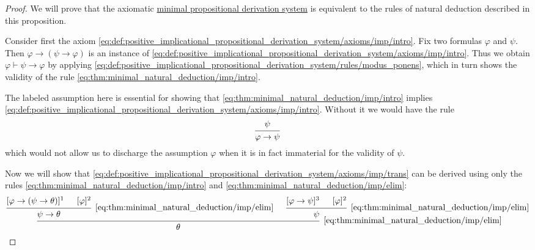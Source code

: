 \begin{proof}
  We will prove that the axiomatic \hyperref[def:minimal_propositional_derivation_system]{minimal propositional derivation system} is equivalent to the rules of natural deduction described in this proposition.

   Consider first the axiom \eqref{eq:def:positive_implicational_propositional_derivation_system/axioms/imp/intro}. Fix two formulas \( \varphi \) and \( \psi \). Then \( \varphi \rightarrow (\psi \rightarrow \varphi) \) is an instance of \eqref{eq:def:positive_implicational_propositional_derivation_system/axioms/imp/intro}. Thus we obtain \( \varphi \vdash \psi \rightarrow \varphi \) by applying \eqref{eq:def:positive_implicational_propositional_derivation_system/rules/modus_ponens}, which in turn shows the validity of the rule \eqref{eq:thm:minimal_natural_deduction/imp/intro}.

  The labeled assumption here is essential for showing that \eqref{eq:thm:minimal_natural_deduction/imp/intro} implies \eqref{eq:def:positive_implicational_propositional_derivation_system/axioms/imp/intro}. Without it we would have the rule
  \begin{equation*}
    \begin{prooftree}
      \hypo{ \psi }
      \infer1{ \varphi \rightarrow \psi }
    \end{prooftree}
  \end{equation*}
  which would not allow us to discharge the assumption \( \varphi \) when it is in fact immaterial for the validity of \( \psi \).

  Now we will show that \eqref{eq:def:positive_implicational_propositional_derivation_system/axioms/imp/trans} can be derived using only the rules \eqref{eq:thm:minimal_natural_deduction/imp/intro} and \eqref{eq:thm:minimal_natural_deduction/imp/elim}:
  \begin{equation}\label{eq:thm:minimal_natural_deduction/imp/trans_derivation}
    \begin{prooftree}
      \hypo{ [\varphi \rightarrow (\psi \rightarrow \theta)]^1 }
      \hypo{ [\varphi]^2 }
      \infer2[\ref{eq:thm:minimal_natural_deduction/imp/elim}]{ \psi \rightarrow \theta }

      \hypo{ [\varphi \rightarrow \psi]^3 }
      \hypo{ [\varphi]^2 }
      \infer2[\ref{eq:thm:minimal_natural_deduction/imp/elim}]{ \psi }

      \infer2[\ref{eq:thm:minimal_natural_deduction/imp/elim}]{ \theta }


\end{prooftree}
\end{equation}
\end{proof}
